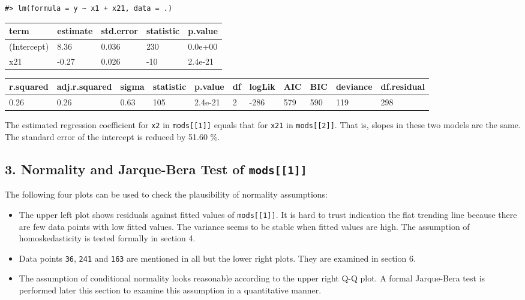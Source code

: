 \documentclass[a4paper]{article}
\providecommand{\tightlist}{%
  \setlength{\itemsep}{0pt}\setlength{\parskip}{0pt}}
\begin{document}
\begin{verbatim}
#> lm(formula = y ~ x1 + x21, data = .)
\end{verbatim}

\begin{table}[H]
\centering
\begin{tabular}{lllll}
\toprule
term & estimate & std.error & statistic & p.value\\
\midrule
(Intercept) & 8.36 & 0.036 & 230 & 0.0e+00\\
x21 & -0.27 & 0.026 & -10 & 2.4e-21\\
\bottomrule
\end{tabular}
\end{table}

\begin{table}[H]
\centering
\begin{tabular}{lllllllllll}
\toprule
r.squared & adj.r.squared & sigma & statistic & p.value & df & logLik & AIC & BIC & deviance & df.residual\\
\midrule
0.26 & 0.26 & 0.63 & 105 & 2.4e-21 & 2 & -286 & 579 & 590 & 119 & 298\\
\bottomrule
\end{tabular}
\end{table}

The estimated regression coefficient for \texttt{x2} in
\texttt{mods{[}{[}1{]}{]}} equals that for \texttt{x21} in
\texttt{mods{[}{[}2{]}{]}}. That is, slopes in these two models are the
same. The standard error of the intercept is reduced by 51.60 \%.

\hypertarget{normality-and-jarque-bera-test-of-mods1}{%
\subsection{\texorpdfstring{3. Normality and Jarque-Bera Test of
\texttt{mods{[}{[}1{]}{]}}}{3. Normality and Jarque-Bera Test of mods{[}{[}1{]}{]}}}\label{normality-and-jarque-bera-test-of-mods1}}

The following four plots can be used to check the plausibility of
normality assumptions:

\begin{itemize}
\tightlist
\item
  The upper left plot shows residuals against fitted values of
  \texttt{mods{[}{[}1{]}{]}}. It is hard to trust indication the flat
  trending line because there are few data points with low fitted
  values. The variance seems to be stable when fitted values are high.
  The assumption of homoskedasticity is tested formally in section 4.
\item
  Data points \texttt{36}, \texttt{241} and \texttt{163} are mentioned
  in all but the lower right plots. They are examined in section 6.
\item
  The assumption of conditional normality looks reasonable according to
  the upper right Q-Q plot. A formal Jarque-Bera test is performed later
  this section to examine this assumption in a quantitative manner.
\end{itemize}
\end{document}
